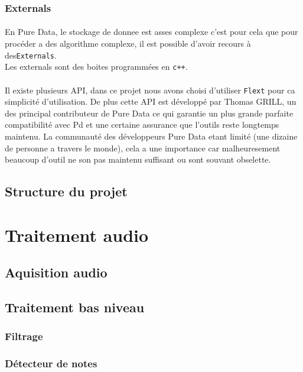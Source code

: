 \documentclass[a4paper, titlepage, oneside, 12pt]{article}%
\begin{document}
\subsubsection{Externals}
\paragraph{}
En Pure Data, le stockage de donnee est asses complexe c'est pour cela que pour procéder a des algorithme complexe, il est possible d'avoir recours à des\texttt{Externals}.\\
Les externals sont des boites programmées en \texttt{c++}. 

\paragraph{}
Il existe plusieurs API, dans ce projet nous avons choisi d'utiliser \texttt{Flext} pour ca simplicité d'utilisation. De plus cette API est développé par Thomas GRILL, un des principal contributeur de Pure Data ce qui garantie un plus grande parfaite compatibilité avec Pd et une certaine assurance que l'outils reste longtemps maintenu. La communauté des développeurs Pure Data etant limité (une dizaine de personne a travers le monde), cela a une importance car malheuresement beaucoup d'outil ne son pas maintenu suffisant ou sont souvant obselette.  


\subsection{Structure du projet}
\newpage
\section{Traitement audio}
\subsection{Aquisition audio}

\subsection{Traitement bas niveau}

\subsubsection{Filtrage}
\subsubsection{Détecteur de notes}
\end{document}

